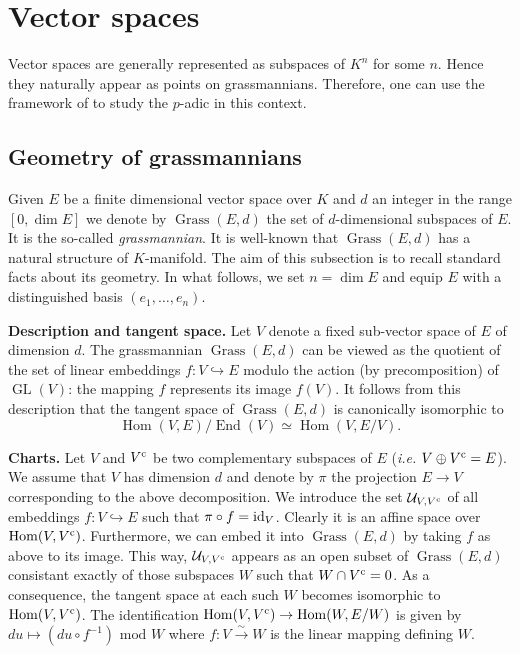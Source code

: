 \documentclass{sig-alternate}
\DeclareMathOperator{\Hom}{Hom}
\DeclareMathOperator{\End}{End}
\DeclareMathOperator{\GL}{GL}
\DeclareMathOperator{\Grass}{Grass}
\begin{document}
\section{Vector spaces}
\label{sec:vectorspaces}

Vector spaces are generally represented as subspaces of $K^n$ for some 
$n$. Hence they naturally appear as points on grassmannians. Therefore, 
one can use the framework of \cite[Appendix A]{caruso-roe-vaccon:14a} to 
study the $p$-adic in this context.

\subsection{Geometry of grassmannians}

Given $E$ be a finite dimensional vector space over $K$ and $d$ an 
integer in the range $[0, \dim E]$ we denote by $\Grass(E,d)$ the 
set of $d$-dimensional subspaces of $E$. It is the so-called 
\emph{grassmannian}. It is well-known that $\Grass(E,d)$ has a 
natural structure of $K$-manifold. The aim of this subsection is to 
recall standard facts about its geometry. In what follows, we set
$n = \dim E$ and equip $E$ with a distinguished basis $(e_1, \ldots, 
e_n)$.

\medskip

\noindent
{\bf Description and tangent space.}
Let $V$ denote a fixed sub-vector space of $E$ of dimension $d$. The 
grassmannian $\Grass(E,d)$ can be viewed as the quotient of the set 
of linear embeddings $f: V \hookrightarrow E$ modulo the action (by 
precomposition) of $\GL(V)$: the mapping $f$ represents its image 
$f(V)$. It follows from this description that the tangent space of 
$\Grass(E,d)$ is canonically isomorphic to $$\Hom(V, E) / \End(V) 
\simeq \Hom(V, E/V).$$

\medskip

\noindent
{\bf Charts.}
Let $V$ and $V^{\text{\rm c}}$ be two complementary subspaces of $E$ 
(\emph{i.e.} $V \oplus V^{\text{\rm c}} = E$). We assume that $V$ has 
dimension $d$ and denote by $\pi$ the projection $E \to V$ 
corresponding to the above decomposition. We introduce the set 
$\mathcal U_{V,V^{\text{\rm c}}}$ of all embeddings $f : V \hookrightarrow E$ 
such that $\pi \circ f = \textrm{id}_V$. Clearly it is an affine space over
$\Hom(V,V^\c)$. 
Furthermore, we can embed it into $\Grass(E,d)$ by taking $f$ as
above to its image. This way, $\mathcal U_{V,V^{\text{\rm c}}}$ appears as
an open subset of $\Grass(E,d)$ consistant exactly of those subspaces 
$W$ such that $W \cap V^{\text{\rm c}} = 0$. As a consequence, the tangent space 
at each such $W$ becomes isomorphic to $\Hom(V,V^\c)$. The
identification $\Hom(V,V^\c) \to \Hom(W, E/W)$ is given by
$du \mapsto (du \circ f^{-1}) \text{ mod } W$ where $f : V 
\stackrel{\sim}{\to} W$ is the linear mapping defining $W$.
\end{document}
